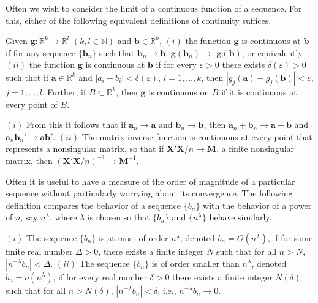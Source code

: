 Often we wish to consider the limit of a continuous function of a sequence.
For this, either of the following equivalent definitions of continuity suffices.

\begin{definition}\label{def:continuity}
Given $\mathbf{g} : \mathbb{R}^k \to \mathbb{R}^l$ $(k, l \in \mathbb{N})$ and $\mathbf{b} \in \mathbb{R}^k$, $(i)$ the function
$\mathbf{g}$ is continuous at $\mathbf{b}$ if for any sequence $\{\mathbf{b}_n\}$ such that $\mathbf{b}_n \to \mathbf{b}$, $\mathbf{g}(\mathbf{b}_n) \to$
$\mathbf{g}(\mathbf{b})$; or equivalently $(ii)$ the function $\mathbf{g}$ is continuous at $\mathbf{b}$ if for every
$\varepsilon > 0$ there exists $\delta(\varepsilon) > 0$ such that if $\mathbf{a} \in \mathbb{R}^k$ and $|a_i - b_i| < \delta(\varepsilon)$,
$i = 1, \ldots, k$, then $|g_j(\mathbf{a}) - g_j(\mathbf{b})| < \varepsilon$, $j = 1, \ldots, l$. Further, if $B \subset \mathbb{R}^k$,
then $\mathbf{g}$ is continuous on $B$ if it is continuous at every point of $B$.
\end{definition}

\begin{example}\label{ex:continuity}
$(i)$ From this it follows that if $\mathbf{a}_n \to \mathbf{a}$ and $\mathbf{b}_n \to \mathbf{b}$, then
$\mathbf{a}_n + \mathbf{b}_n \to \mathbf{a} + \mathbf{b}$ and $\mathbf{a}_n\mathbf{b}_n' \to \mathbf{a}\mathbf{b}'$. $(ii)$ The matrix inverse function is
continuous at every point that represents a nonsingular matrix, so that if
$\mathbf{X}'\mathbf{X}/n \to \mathbf{M}$, a finite nonsingular matrix, then $(\mathbf{X}'\mathbf{X}/n)^{-1} \to \mathbf{M}^{-1}$.
\end{example}

Often it is useful to have a measure of the order of magnitude of a
particular sequence without particularly worrying about its convergence.
The following definition compares the behavior of a sequence $\{b_n\}$ with the
behavior of a power of $n$, say $n^{\lambda}$, where $\lambda$ is chosen so that $\{b_n\}$ and $\{n^{\lambda}\}$
behave similarly.

\begin{definition}\label{def:bigO-littleo}
$(i)$ The sequence $\{b_n\}$ is at most of order $n^{\lambda}$, denoted
$b_n = O(n^{\lambda})$, if for some finite real number $\Delta > 0$, there exists a finite
integer $N$ such that for all $n > N$, $|n^{-\lambda}b_n| < \Delta$. $(ii)$ The sequence $\{b_n\}$ is
of order smaller than $n^{\lambda}$, denoted $b_n = o(n^{\lambda})$, if for every real number $\delta > 0$
there exists a finite integer $N(\delta)$ such that for all $n > N(\delta)$, $|n^{-\lambda}b_n| < \delta$,
i.e., $n^{-\lambda}b_n \to 0$.
\end{definition}

